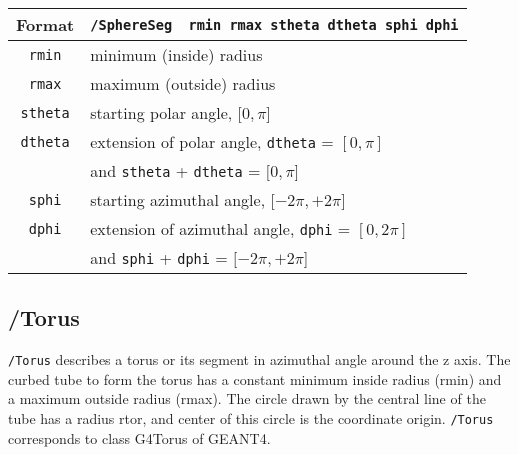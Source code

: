 \begin{tabular}{|c|l|}
\hline%
Format & \verb+/SphereSeg  rmin rmax stheta dtheta sphi dphi+\\
\hline%
\verb+rmin+  & minimum (inside)  radius \\
\hline%
\verb+rmax+  & maximum (outside) radius \\
\hline%
\verb+stheta+  & starting polar angle, $[0, \pi$] \\
\hline%
\verb+dtheta+  &  extension of polar angle, \verb+dtheta+ = $[0, \pi]$\\
               &  and \verb+stheta+ + \verb+dtheta+ = $[0, \pi$] \\
\hline%
\verb+sphi+  & starting azimuthal angle, $[-2\pi, +2\pi$] \\
\hline%
\verb+dphi+  &  extension of azimuthal angle, \verb+dphi+ = $[0, 2\pi]$\\
             &  and \verb+sphi+ + \verb+dphi+ = $[-2\pi, +2\pi$] \\
\hline%
\end{tabular}

\subsection{/Torus}
\verb+/Torus+ describes a torus or its segment in azimuthal angle
around the z axis.
The curbed tube to form the torus has 
a constant minimum inside radius (rmin) and a maximum outside radius (rmax).
The circle drawn by the central line of the tube has a radius rtor,
and center of this circle is the coordinate origin.
\verb+/Torus+ corresponds to class G4Torus of GEANT4.
\vspace{.20in}

